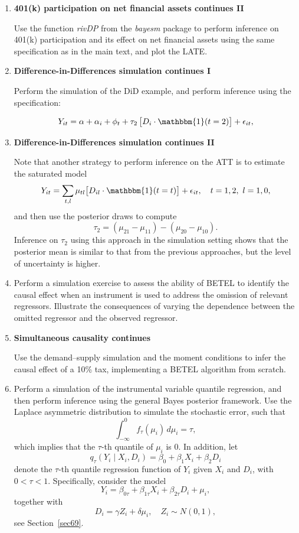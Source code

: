 \begin{enumerate}
	\item \textbf{401(k) participation on net financial assets continues II} 
	
	Use the function \textit{rivDP} from the \textit{bayesm} package to perform inference on 401(k) participation and its effect on net financial assets using the same specification as in the main text, and plot the LATE.
	
	\item \textbf{Difference-in-Differences simulation continues I}
	
	Perform the simulation of the DiD example, and perform inference using the specification:
	
	\[
	Y_{it} = \alpha + \alpha_i + \phi_t + \tau_2 \,\big[ D_i \cdot \mathbbm{1}(t = 2) \big] + \epsilon_{it},
	\]
	
	\item \textbf{Difference-in-Differences simulation continues II}
	
	Note that another strategy to perform inference on the ATT is to estimate the saturated model
	\[
	Y_{it} = \sum_{t,l} \mu_{tl} \big[ D_{il} \cdot \mathbbm{1}(t = t) \big] + \epsilon_{it}, \quad t = 1, 2, \ l = 1, 0,
	\]
	and then use the posterior draws to compute
	\[
	\tau_2 = (\mu_{21} - \mu_{11}) - (\mu_{20} - \mu_{10}).
	\]
	Inference on $\tau_2$ using this approach in the simulation setting shows that the posterior mean is similar to that from the previous approaches, but the level of uncertainty is higher.
	
	\item Perform a simulation exercise to assess the ability of BETEL to identify the causal effect when an instrument is used to address the omission of relevant regressors. Illustrate the consequences of varying the dependence between the omitted regressor and the observed regressor.
	
	\item \textbf{Simultaneous causality continues}
	
	Use the demand–supply simulation and the moment conditions to infer the causal effect of a	10\% tax, implementing a BETEL algorithm from scratch.
	
	\item Perform a simulation of the instrumental variable quantile regression, and then perform inference using the general Bayes posterior framework. Use the Laplace asymmetric distribution to simulate the stochastic error, such that 
	\[
	\int_{-\infty}^{0} f_{\tau}(\mu_i) \, d\mu_i = \tau,
	\] 
	which implies that the $\tau$-th quantile of $\mu_i$ is 0. In addition, let 
	\[
	q_{\tau}(Y_i \mid X_i, D_i) = \beta_0 + \beta_1 X_i + \beta_2 D_i
	\] 
	denote the $\tau$-th quantile regression function of $Y_i$ given $X_i$ and $D_i$, with $0 < \tau < 1$. Specifically, consider the model
	\[
	Y_i = \beta_{0\tau} + \beta_{1\tau} X_i + \beta_{2\tau} D_i + \mu_i,
	\]
	together with 
	\[
	D_i = \gamma Z_i + \delta \mu_i, \quad Z_i \sim N(0,1),
	\]
	see Section~\ref{sec69}.
	
	
	
	
	
	  
	 
	
	
\end{enumerate}
